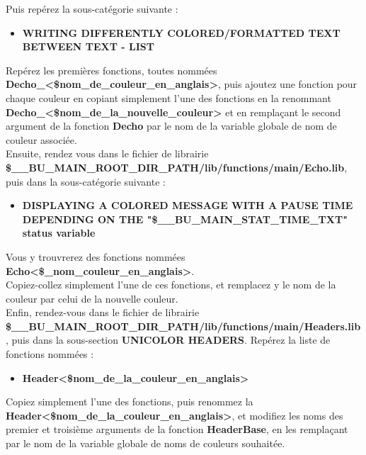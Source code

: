 \documentclass[a4paper,10pt]{article}
\begin{document}
Puis repérez la sous-catégorie suivante :
\begin{itemize}
    \item \textbf{WRITING DIFFERENTLY COLORED/FORMATTED TEXT BETWEEN TEXT - LIST}\\[1\baselineskip]
\end{itemize}

Repérez les premières fonctions, toutes nommées \textbf{\color{mauve}Decho\_<\$nom\_de\_couleur\_en\_anglais>}, puis ajoutez une fonction pour chaque couleur en copiant simplement l'une des fonctions en la renommant \textbf{\color{mauve}Decho\_<\$nom\_de\_la\_nouvelle\_couleur>} et en remplaçant le second argument de la fonction \textbf{\color{mauve}Decho} par le nom de la variable globale de nom de couleur associée.\\[2\baselineskip]


Ensuite, rendez vous dans le fichier de librairie \textbf{\color{orange}\$\_\_BU\_MAIN\_ROOT\_DIR\_PATH\color{lime}/lib/functions/main/Echo.lib}, puis dans la sous-catégorie suivante :\\
\begin{itemize}
    \item \textbf{DISPLAYING A COLORED MESSAGE WITH A PAUSE TIME DEPENDING ON THE "\$\_\_BU\_MAIN\_STAT\_TIME\_TXT" status variable}\\[1\baselineskip]
\end{itemize}

 Vous y trouvrerez des fonctions nommées \textbf{\color{mauve}Echo<\$\_nom\_couleur\_en\_anglais>}.\\[1\baselineskip]
 
 Copiez-collez simplement l'une de ces fonctions, et remplacez y le nom de la couleur par celui de la nouvelle couleur.\\[2\baselineskip]


Enfin, rendez-vous dans le fichier de librairie \textbf{\color{orange}\$\_\_BU\_MAIN\_ROOT\_DIR\_PATH\color{lime}/lib/functions/main/Headers.lib}, puis dans la sous-section \textbf{UNICOLOR HEADERS}. Repérez la liste de fonctions nommées :
\begin{itemize}
    \item \textbf{\color{mauve}Header<\$nom\_de\_la\_couleur\_en\_anglais>}\linebreak
\end{itemize}

Copiez simplement l'une des fonctions, puis renommez la \textbf{\color{mauve}Header<\$nom\_de\_la\_couleur\_en\_anglais>},
et modifiez les noms des premier et troisième arguments de la fonction \textbf{\color{mauve}HeaderBase}, en les
remplaçant par le nom de la variable globale de noms de couleurs souhaitée.\\[1\baselineskip]
\end{document}

